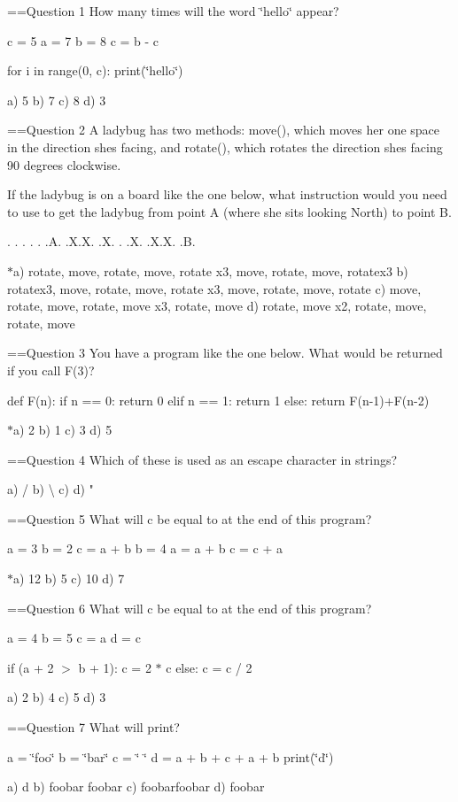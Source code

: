 ==Question 1 How many times will the word \char`\"{}hello\char`\"{} appear?

c = 5 a = 7 b = 8 c = b -\/ c

for i in range(0, c)\+: print(\char`\"{}hello\char`\"{})

a) 5 b) 7 c) 8 d) 3

==Question 2 A ladybug has two methods\+: move(), which moves her one space in the direction she\textquotesingle{}s facing, and rotate(), which rotates the direction she\textquotesingle{}s facing 90 degrees clockwise.

If the ladybug is on a board like the one below, what instruction would you need to use to get the ladybug from point A (where she sits looking North) to point B.

. . . . . .A. .X.\+X. .X. . .X. .X.\+X. .B.

$\ast$a) rotate, move, rotate, move, rotate x3, move, rotate, move, rotatex3 b) rotatex3, move, rotate, move, rotate x3, move, rotate, move, rotate c) move, rotate, move, rotate, move x3, rotate, move d) rotate, move x2, rotate, move, rotate, move

==Question 3 You have a program like the one below. What would be returned if you call F(3)?

def F(n)\+: if n == 0\+: return 0 elif n == 1\+: return 1 else\+: return F(n-\/1)+\+F(n-\/2)

$\ast$a) 2 b) 1 c) 3 d) 5

==Question 4 Which of these is used as an escape character in strings?

a) / b) \textbackslash{} c) \textquotesingle{} d) "

==Question 5 What will c be equal to at the end of this program?

a = 3 b = 2 c = a + b b = 4 a = a + b c = c + a

$\ast$a) 12 b) 5 c) 10 d) 7

==Question 6 What will c be equal to at the end of this program?

a = 4 b = 5 c = a d = c

if (a + 2 $>$ b + 1)\+: c = 2 $\ast$ c else\+: c = c / 2

a) 2 b) 4 c) 5 d) 3

==Question 7 What will print?

a = \char`\"{}foo\char`\"{} b = \char`\"{}bar\char`\"{} c = \char`\"{} \char`\"{} d = a + b + c + a + b print(\char`\"{}d\char`\"{})

a) d b) foobar foobar c) foobarfoobar d) foobar

